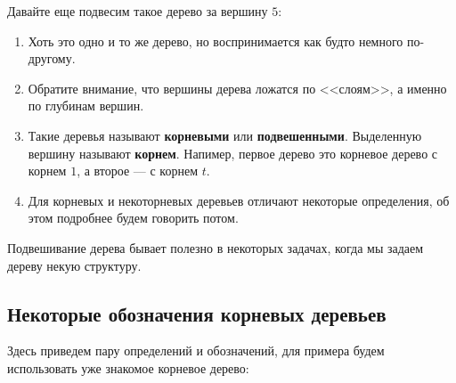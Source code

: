 \documentclass[../../main.tex]{subfiles}
\begin{document}
Давайте еще подвесим такое дерево за вершину $5$:

\begin{center}
\end{center}

\begin{enumerate}
    \item Хоть это одно и то же дерево, но воспринимается как будто немного по-другому. 
    \item Обратите внимание, что вершины дерева ложатся по <<слоям>>, а именно по глубинам вершин. 
    \item Такие деревья называют \textbf{корневыми} или \textbf{подвешенными}. Выделенную вершину называют \textbf{корнем}. Напимер, первое дерево это корневое дерево с корнем $1$, а второе --- с корнем $t$.
    \item Для корневых и некоторневых деревьев отличают некоторые определения, об этом подробнее будем говорить потом.
\end{enumerate}

Подвешивание дерева бывает полезно в некоторых задачах, когда мы задаем дереву некую структуру. 

\subsection{Некоторые обозначения корневых деревьев}

Здесь приведем пару определений и обозначений, для примера будем использовать уже знакомое корневое дерево:
\end{document}
